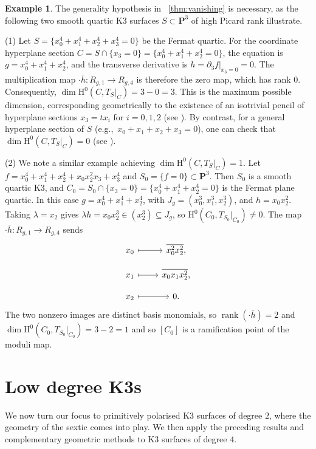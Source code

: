 \documentclass[a4paper,12pt,twoside,reqno]{amsart}
\makeatletter
\numberwithin{equation}{section}
\def\cr@pref#1:#2\@nil{#1}
\newcommand{\cr@tsing}[1]{\@nameuse{cr@map@\cr@pref#1:\@nil}}
\newcommand{\Cref}[1]{\cr@tsing{#1}~\ref{#1}}
\theoremstyle{plain}
\theoremstyle{definition}
\newtheorem{example}[theorem]{Example}
\DeclareMathOperator{\rank}{rank}
\newcommand{\PP}{\mathbf{P}}
\newcommand{\Jf}{J_{g}}
\newcommand{\HH}{\mathrm{H}}
\theoremstyle{plain}
\theoremstyle{definition}
\makeatother
\begin{document}
\begin{example}\label{ex:quarticexamples}
The generality hypothesis in \Cref{thm:vanishing} is necessary, as the following two smooth quartic K3 surfaces $S\subset\PP^3$ of high Picard rank illustrate.

(1) Let $S = \{x_0^4+x_1^4+x_2^4+x_3^4=0\}$ be the Fermat quartic. For the coordinate hyperplane section $C = S \cap \{x_3=0\} = \{x_0^4+x_1^4+x_2^4=0\}$, the equation is $g = x_0^4+x_1^4+x_2^4$, and the transverse derivative is $h = \partial_3 f|_{x_3=0} = 0$. The multiplication map $\cdot \bar{h} \colon R_{g,1} \to R_{g,4}$ is therefore the zero map, which has rank $0$. Consequently, $\dim \HH^0(C, T_S|_C) = 3 - 0 = 3$. This is the maximum possible dimension, corresponding geometrically to the existence of an isotrivial pencil of hyperplane sections $x_3 = t x_i$ for $i=0,1,2$ (see \cite[Examples 3.5 and 6.20]{Bertsch}). By contrast, for a general hyperplane section of $S$ (e.g.,\ $x_0+x_1+x_2+x_3=0$), one can check that $\dim \HH^0(C, T_S|_C) = 0$ (see \cite[Theorem 6.21]{Bertsch}).


(2) We note a similar example achieving $\dim \HH^0(C, T_S|_C)=1$. Let $f=x_0^4+x_1^4+x_2^4+x_0x_2^2x_3+x_3^4$ and $S_0=\{f=0\}\subset\PP^3$. Then $S_0$ is a smooth quartic K3, and $C_0=S_0\cap\{x_3=0\}=\{x_0^4+x_1^4+x_2^4=0\}$ is the Fermat plane quartic. In this case $g=x_0^4+x_1^4+x_2^4$, with $\Jf=(x_0^3,x_1^3,x_2^3)$, and $h=x_0x_2^2$. Taking $\lambda=x_2$ gives $\lambda h=x_0x_2^3\in(x_2^3)\subseteq\Jf$, so $\HH^0(C_0,T_{S_0}|_{C_0})\neq0$. The map $\cdot\bar h\colon R_{g,1}\to R_{g,4}$ sends 
\[
\begin{tikzcd}[row sep=small]
x_0 \arrow[r, mapsto] & \overline{x_0^2x_2^2},\\
x_1 \arrow[r, mapsto] & \overline{x_0x_1x_2^2},\\
x_2 \arrow[r, mapsto] & 0.
\end{tikzcd}
\]
The two nonzero images are distinct basis monomials, so $\rank(\cdot\bar h)=2$ and $\dim \HH^0(C_0,T_{S_0}|_{C_0})=3-2=1$ and so $[C_0]$ is a ramification point of the moduli map.
\end{example}





\section{Low degree K3s}\label{sec:low-degree-k3}


We now turn our focus to primitively polarised K3 surfaces of degree $2$, where the geometry of the sextic comes into play. We then apply the preceding results and complementary geometric methods to K3 surfaces of degree $4$.
\end{document}
